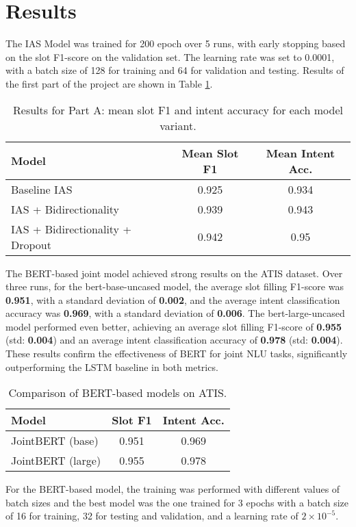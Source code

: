 \documentclass[a4paper]{article}
\begin{document}
\section{Results}
The IAS Model was trained for 200 epoch over 5 runs, with early stopping based on the slot F1-score on the validation set.
The learning rate was set to 0.0001, with a batch size of 128 for training and 64 for validation and testing. 
Results of the first part of the project are shown in Table \ref{tab:partAresults}.
\begin{table}[h!]
  \centering
  \begin{tabular}{lcc}
    \toprule
    \textbf{Model} & \textbf{Mean Slot F1} & \textbf{Mean Intent Acc.} \\
    \midrule
    Baseline IAS & 0.925 & 0.934 \\
    IAS + Bidirectionality & 0.939 & 0.943 \\
    IAS + Bidirectionality + Dropout & 0.942 & 0.95 \\ 
    \bottomrule
  \end{tabular}
  \caption{Results for Part A: mean slot F1 and intent accuracy for each model variant.}
  \label{tab:partAresults}
\end{table}

The BERT-based joint model achieved strong results on the ATIS dataset. Over three runs, for the bert-base-uncased model, the average slot filling F1-score was \textbf{ 0.951}, with a standard deviation of \textbf{0.002}, and the average intent classification accuracy
 was \textbf{0.969}, with a standard deviation of \textbf{0.006}. The bert-large-uncased model performed even better, achieving an average slot filling F1-score of \textbf{0.955} (std: \textbf{0.004}) and an average intent classification accuracy of \textbf{0.978} (std: \textbf{0.004}). 
These results confirm the effectiveness of BERT for joint NLU tasks, significantly outperforming the LSTM baseline in both metrics.

\begin{table}[h!]
  \centering
  \begin{tabular}{lcc}
    \toprule
    \textbf{Model} & \textbf{Slot F1} & \textbf{Intent Acc.} \\
    \midrule
    JointBERT (base) & 0.951 & 0.969 \\
    JointBERT (large)   & 0.955 & 0.978 \\
    \bottomrule
  \end{tabular}
  \caption{Comparison of BERT-based models on ATIS.}
  \label{tab:results}
\end{table}

For the BERT-based model, the training was performed with different values of 
batch sizes and the best model was the one trained for 3 epochs with
 a batch size of 16 for 
training, 32 for testing and validation, and a learning rate 
of $2 \times 10^{-5}$.




\end{document}
